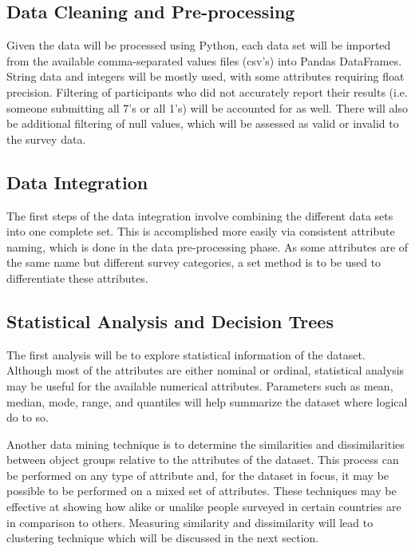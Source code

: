 \documentclass[11pt,sigconf]{acmart}
\begin{document}

\subsection{Data Cleaning and Pre-processing}

Given the data will be processed using Python, each data set will be imported from the available comma-separated values files (csv's) into Pandas DataFrames. String data and integers will be mostly used, with some attributes requiring float precision. Filtering of participants who did not accurately report their results (i.e. someone submitting all 7's or all 1's) will be accounted for as well. There will also be additional filtering of null values, which will be assessed as valid or invalid to the survey data.

\subsection{Data Integration}

The first steps of the data integration involve combining the different data sets into one complete set. This is accomplished more easily via consistent attribute naming, which is done in the data pre-processing phase. As some attributes are of the same name but different survey categories, a set method is to be used to differentiate these attributes. 

\subsection{Statistical Analysis and Decision Trees}

The first analysis will be to explore statistical information of the dataset. Although most of the attributes are either nominal or ordinal, statistical analysis may be useful for the available numerical attributes. Parameters such as mean, median, mode, range, and quantiles will help summarize the dataset where logical do to so.

Another data mining technique is to determine the similarities and dissimilarities between object groups relative to the attributes of the dataset. This process can be performed on any type of attribute and, for the dataset in focus, it may be possible to be performed on a mixed set of attributes. These techniques may be effective at showing how alike or unalike people surveyed in certain countries are in comparison to others. Measuring similarity and dissimilarity will lead to clustering technique which will be discussed in the next section.
\end{document}

